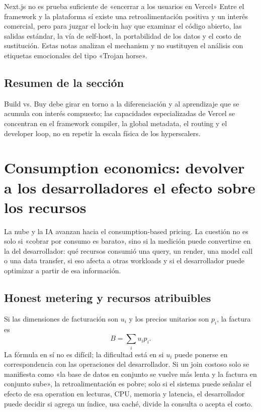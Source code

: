 \documentclass[a4paper]{article}
\begin{document}
\begin{warningbox}{Next.js no es prueba suficiente de «encerrar a los usuarios en Vercel»}
Entre el framework y la plataforma sí existe una retroalimentación positiva y un interés comercial, pero para juzgar el lock-in hay que examinar el código abierto, las salidas estándar, la vía de self-host, la portabilidad de los datos y el costo de sustitución. Estas notas analizan el mechanism y no sustituyen el análisis con etiquetas emocionales del tipo «Trojan horse».
\end{warningbox}


\subsection{Resumen de la sección}

Build vs. Buy debe girar en torno a la diferenciación y al aprendizaje que se acumula con interés compuesto; las capacidades especializadas de Vercel se concentran en el framework compiler, la global metadata, el routing y el developer loop, no en repetir la escala física de los hyperscalers.
\section{Consumption economics: devolver a los desarrolladores el efecto sobre los recursos}

La nube y la IA avanzan hacia el consumption-based pricing. La cuestión no es solo si «cobrar por consumo es barato», sino si la medición puede convertirse en la  del desarrollador: qué recursos consumió una query, un render, una model call o una data transfer, si eso afecta a otras workloads y si el desarrollador puede optimizar a partir de esa información.

\subsection{Honest metering y recursos atribuibles}

Si las dimensiones de facturación son $u_i$ y los precios unitarios son $p_i$, la factura es
\[
B=\sum_i u_i p_i.
\]
La fórmula en sí no es difícil; la dificultad está en si $u_i$ puede ponerse en correspondencia con las operaciones del desarrollador. Si un join costoso solo se manifiesta como «la base de datos en conjunto se vuelve más lenta y la factura en conjunto sube», la retroalimentación es pobre; solo si el sistema puede señalar el efecto de esa operation en lecturas, CPU, memoria y latencia, el desarrollador puede decidir si agrega un índice, usa caché, divide la consulta o acepta el costo.
\end{document}
